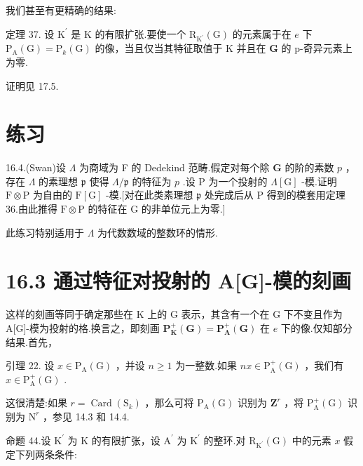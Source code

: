 \documentclass[10pt]{article}
\begin{document}
我们甚至有更精确的结果:

定理 37. 设 \({\mathrm{K}}^{\prime }\) 是 \(\mathrm{K}\) 的有限扩张.要使一个 \({\mathrm{R}}_{{\mathrm{K}}^{\prime }}\left( \mathrm{G}\right)\) 的元素属于在 \(e\) 下 \({\mathrm{P}}_{\mathrm{A}}\left( \mathrm{G}\right)  = {\mathrm{P}}_{k}\left( \mathrm{G}\right)\) 的像，当且仅当其特征取值于 \(\mathrm{K}\) 并且在 \(\mathbf{G}\) 的 p-奇异元素上为零.

证明见 17.5.

\section*{练习}

16.4.(Swan)设 \(\Lambda\) 为商域为 F 的 Dedekind 范畴.假定对每个除 \(\mathbf{G}\) 的阶的素数 \(p\) ，存在 \(\Lambda\) 的素理想 \(\mathfrak{p}\) 使得 \(\Lambda /\mathfrak{p}\) 的特征为 \(p\) .设 \(\mathrm{P}\) 为一个投射的 \(\Lambda \left\lbrack  \mathrm{G}\right\rbrack\) -模.证明 \(\mathrm{F} \otimes  \mathrm{P}\) 为自由的 \(\mathrm{F}\left\lbrack  \mathrm{G}\right\rbrack\) -模.[对在此类素理想 \(\mathfrak{p}\) 处完成后从 \(\mathrm{P}\) 得到的模套用定理 36.由此推得 \(\mathrm{F} \otimes  \mathrm{P}\) 的特征在 \(\mathrm{G}\) 的非单位元上为零.]

此练习特别适用于 \(\Lambda\) 为代数数域的整数环的情形.

\section*{16.3 通过特征对投射的 A[G]-模的刻画}

这样的刻画等同于确定那些在 K 上的 G 表示，其含有一个在 G 下不变且作为 A[G]-模为投射的格.换言之，即刻画 \({\mathbf{P}}_{\mathbf{K}}^{ + }\left( \mathbf{G}\right)  = {\mathbf{P}}_{\mathbf{A}}^{ + }\left( \mathbf{G}\right)\) 在 \(e\) 下的像.仅知部分结果.首先，

引理 22. 设 \(x \in  {\mathrm{P}}_{\mathrm{A}}\left( \mathrm{G}\right)\) ，并设 \(n \geq  1\) 为一整数.如果 \({nx} \in  {\mathrm{P}}_{\mathrm{A}}^{ + }\left( \mathrm{G}\right)\) ，我们有 \(x \in  {\mathrm{P}}_{\mathrm{A}}^{ + }\left( \mathrm{G}\right)\) .

这很清楚:如果 \(r = \operatorname{Card}\left( {\mathrm{S}}_{k}\right)\) ，那么可将 \({\mathrm{P}}_{\mathrm{A}}\left( \mathrm{G}\right)\) 识别为 \({\mathbf{Z}}^{r}\) ，将 \({\mathrm{P}}_{\mathrm{A}}^{ + }\left( \mathrm{G}\right)\) 识别为 \({\mathrm{N}}^{r}\) ，参见 14.3 和 14.4.

命题 44.设 \({\mathrm{K}}^{\prime }\) 为 \(\mathrm{K}\) 的有限扩张，设 \({\mathrm{A}}^{\prime }\) 为 \({\mathrm{K}}^{\prime }\) 的整环.对 \({\mathrm{R}}_{{\mathrm{K}}^{\prime }}\left( \mathrm{G}\right)\) 中的元素 \(x\) 假定下列两条条件:
\end{document}
